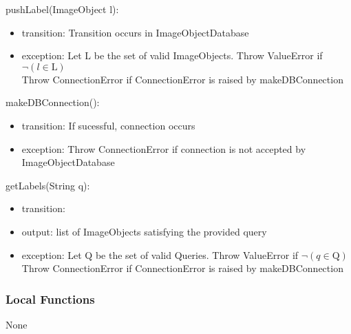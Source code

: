\documentclass[12pt, titlepage]{article}
\begin{document}
  \noindent pushLabel(ImageObject l):
  \begin{itemize}
  \item transition: Transition occurs in ImageObjectDatabase
  \item exception: Let L be the set of valid ImageObjects. Throw ValueError if $\neg (l \in \text{L})$\\
  Throw ConnectionError if ConnectionError is raised by makeDBConnection
  \end{itemize}

  \noindent makeDBConnection():
  \begin{itemize}
  \item transition: If sucessful, connection occurs
  \item exception: Throw ConnectionError if connection is not accepted by ImageObjectDatabase
  \end{itemize}

  \noindent getLabels(String q):
  \begin{itemize}
  \item transition: 
  \item output: list of ImageObjects satisfying the provided query
  \item exception: Let Q be the set of valid Queries. Throw ValueError if $\neg (q \in \text{Q})$\\
  Throw ConnectionError if ConnectionError is raised by makeDBConnection

  \end{itemize}
  
  
  
  \subsubsection{Local Functions}

  None
  
\end{document}
